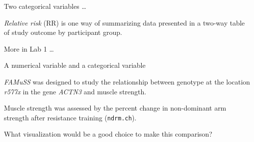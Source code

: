 \documentclass[10pt]{beamer}\usepackage[]{graphicx}\usepackage[]{color}
\begin{document}
						\begin{frame}{Two categorical variables \dots}
							\protect\hypertarget{two-categorical-variables-4}{}
							
							\emph{Relative risk} (RR) is one way of summarizing data presented in a
							two-way table of study outcome by participant group.
							
							More in Lab 1 \dots
							
						\end{frame}
						
						\begin{frame}{A numerical variable and a categorical variable}
							\protect\hypertarget{a-numerical-variable-and-a-categorical-variable}{}
							
							\emph{FAMuSS} was designed to study the relationship between genotype at
							the location \emph{r577x} in the gene \emph{ACTN3} and muscle strength.
							
							Muscle strength was assessed by the percent change in non-dominant arm
							strength after resistance training (\texttt{ndrm.ch}).
							
							What visualization would be a good choice to make this comparison?
							
						\end{frame}
						
\end{document}
